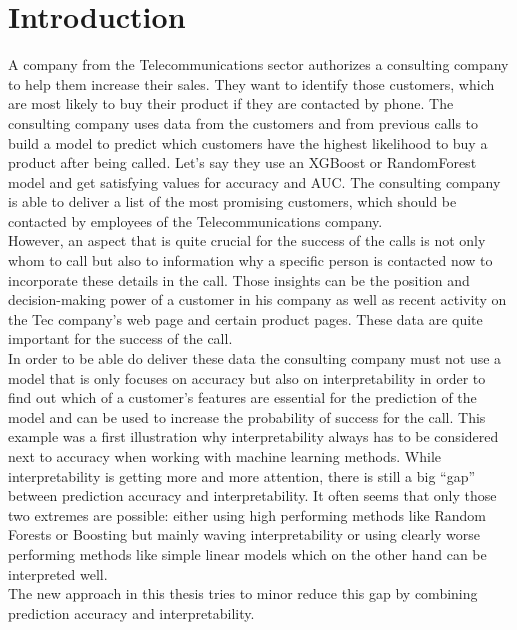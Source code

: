 \documentclass{article}
\begin{document}
\newpage

\section{Introduction}

A company from the Telecommunications sector authorizes a consulting company to help them increase their sales. They want to identify those customers, which are most likely to buy their product if they are contacted by phone.  The consulting company uses data from the customers and from previous calls to build a model to predict which customers have the highest likelihood to buy a product after being called. Let’s say they use an XGBoost or RandomForest model and get satisfying values for accuracy and AUC. The consulting company is able to deliver a list of the most promising customers, which should be contacted by employees of the Telecommunications company. \\
However, an aspect that is quite crucial for the success of the calls is not only whom to call but also to information why a specific person is contacted now to incorporate these details in the call. Those insights can be the position and decision-making power of a customer in his company as well as recent activity on the Tec company’s web page and certain product pages. These data are quite important for the success of the call. \\
In order to be able do deliver these data the consulting company must not use a model that is only focuses on accuracy but also on interpretability in order to find out which of a customer’s features are essential for the prediction of the model and can be used to increase the probability of success for the call.
This example was a first illustration why interpretability always has to be considered next to accuracy when working with machine learning methods. 
While interpretability is getting more and more attention, there is still a big “gap” between prediction accuracy and interpretability. It often seems that only those two extremes are possible: either using high performing methods like Random Forests or Boosting but mainly waving interpretability or using clearly worse performing methods like simple linear models which on the other hand can be interpreted well. \\
The new approach in this thesis tries to minor reduce this gap by combining prediction accuracy and interpretability.
\end{document}
